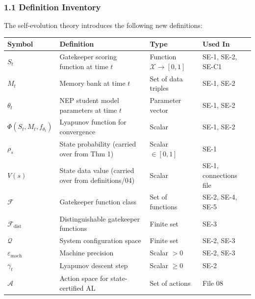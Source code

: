 \documentclass[
  12pt,
]{article}
\begin{document}
\subsubsection{1.1 Definition Inventory}\label{definition-inventory}

The self-evolution theory introduces the following new definitions:

\begin{longtable}[]{@{}
  >{\raggedright\arraybackslash}p{}
  >{\raggedright\arraybackslash}p{}
  >{\raggedright\arraybackslash}p{}
  >{\raggedright\arraybackslash}p{}@{}}
\toprule\noalign{}
\begin{minipage}[b]{\linewidth}\raggedright
Symbol
\end{minipage} & \begin{minipage}[b]{\linewidth}\raggedright
Definition
\end{minipage} & \begin{minipage}[b]{\linewidth}\raggedright
Type
\end{minipage} & \begin{minipage}[b]{\linewidth}\raggedright
Used In
\end{minipage} \\
\midrule\noalign{}
\endhead
\bottomrule\noalign{}
\endlastfoot
\(S_t\) & Gatekeeper scoring function at time \(t\) & Function
\(\mathcal{X} \to [0,1]\) & SE-1, SE-2, SE-C1 \\
\(M_t\) & Memory bank at time \(t\) & Set of data triples & SE-1,
SE-2 \\
\(\theta_t\) & NEP student model parameters at time \(t\) & Parameter
vector & SE-1, SE-2 \\
\(\Phi(S_t, M_t, f_{\theta_t})\) & Lyapunov function for convergence &
Scalar & SE-1, SE-2 \\
\(\rho_s\) & State probability (carried over from Thm 1) & Scalar
\(\in [0,1]\) & SE-1 \\
\(V(s)\) & State data value (carried over from definitions/04) & Scalar
& SE-1, connections file \\
\(\mathcal{F}\) & Gatekeeper function class & Set of functions & SE-2,
SE-4, SE-5 \\
\(\mathcal{F}_{\text{dist}}\) & Distinguishable gatekeeper functions &
Finite set & SE-3 \\
\(\mathcal{Q}\) & System configuration space & Finite set & SE-2,
SE-3 \\
\(\varepsilon_{\text{mach}}\) & Machine precision & Scalar \(> 0\) &
SE-2, SE-3 \\
\(\gamma_t\) & Lyapunov descent step & Scalar \(\geq 0\) & SE-2 \\
\(\mathcal{A}\) & Action space for state-certified AL & Set of actions &
File 08 \\
\end{longtable}
\end{document}
